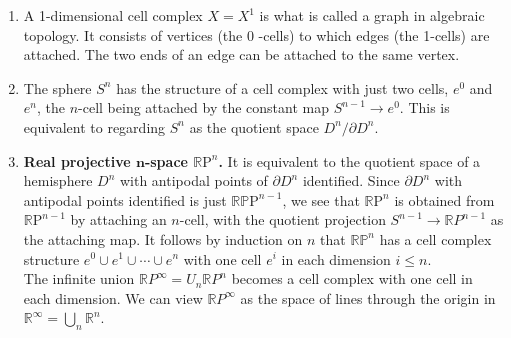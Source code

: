 \begin{example}
    \begin{enumerate}
        \item A 1-dimensional cell complex $X=X^1$ is what is called a graph in algebraic topology. It consists of vertices (the 0 -cells) to which edges (the 1-cells) are attached. The two ends of an edge can be attached to the same vertex.
        \item The sphere $S^n$ has the structure of a cell complex with just two cells, $e^0$ and $e^n$, the $n$-cell being attached by the constant map $S^{n-1} \rightarrow e^0$. This is equivalent to regarding $S^n$ as the quotient space $D^n / \partial D^n$.
        \item \textbf{Real projective $\boldsymbol{n}$-space $\mathbb{R} \mathrm{P}^n$.} It is equivalent to the quotient space of a hemisphere $D^n$ with antipodal points of $\partial D^n$ identified. Since $\partial D^n$ with antipodal points identified is just $\mathbb{R P} \mathrm{P}^{n-1}$, we see that $\mathbb{R} \mathrm{P}^n$ is obtained from $\mathbb{R} \mathrm{P}^{n-1}$ by attaching an $n$-cell, with the quotient projection $S^{n-1} \rightarrow \mathbb{R} P^{n-1}$ as the attaching map. It follows by induction on $n$ that $\mathbb{R P}^n$ has a cell complex structure $e^0 \cup e^1 \cup \cdots \cup e^n$ with one cell $e^i$ in each dimension $i \leq n$.\\
        The infinite union $\mathbb{R} P^{\infty}=U_n \mathbb{R} P^n$ becomes a cell complex with one cell in each dimension. We can view $\mathbb{R} P^{\infty}$ as the space of lines through the origin in $\mathbb{R}^{\infty}=\bigcup_n \mathbb{R}^n$.
        

\end{enumerate}
\end{example}
